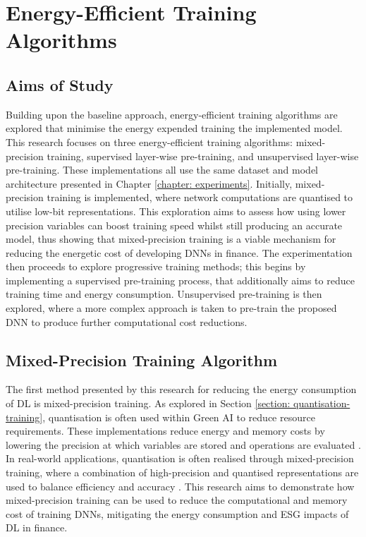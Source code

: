 \documentclass[a4paper, 11pt]{report}
\begin{document}
    \chapter{Energy-Efficient Training Algorithms}
    \label{chapter: energy-extensions}

    \section{Aims of Study}

    Building upon the baseline approach, energy-efficient training algorithms are explored that minimise the energy expended training the implemented model. This research focuses on three energy-efficient training algorithms: mixed-precision training, supervised layer-wise pre-training, and unsupervised layer-wise pre-training. These implementations all use the same dataset and model architecture presented in Chapter \ref{chapter: experiments}. Initially, mixed-precision training is implemented, where network computations are quantised to utilise low-bit representations. This exploration aims to assess how using lower precision variables can boost training speed whilst still producing an accurate model, thus showing that mixed-precision training is a viable mechanism for reducing the energetic cost of developing DNNs in finance. The experimentation then proceeds to explore progressive training methods; this begins by implementing a supervised pre-training process, that additionally aims to reduce training time and energy consumption. Unsupervised pre-training is then explored, where a more complex approach is taken to pre-train the proposed DNN to produce further computational cost reductions.


    \section{Mixed-Precision Training Algorithm}
    \label{section: mixed-precision-method}

    The first method presented by this research for reducing the energy consumption of DL is mixed-precision training. As explored in Section \ref{section: quantisation-training}, quantisation is often used within Green AI to reduce resource requirements. These implementations reduce energy and memory costs by lowering the precision at which variables are stored and operations are evaluated \citep{fan-2020b}. In real-world applications, quantisation is often realised through mixed-precision training, where a combination of high-precision and quantised representations are used to balance efficiency and accuracy \citep{ott-2017}. This research aims to demonstrate how mixed-precision training can be used to reduce the computational and memory cost of training DNNs, mitigating the energy consumption and ESG impacts of DL in finance.
\end{document}
